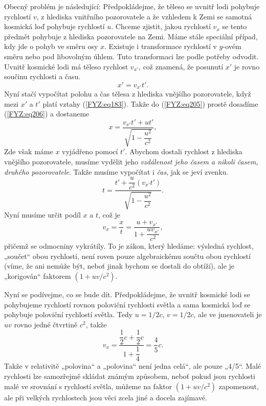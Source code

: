 {    Obecný problém je následující: Předpokládejme, že těleso se uvnitř lodi pohybuje rychlostí 
    \(v\), z hlediska vnitřního pozorovatele a že vzhledem k Zemi se samotná kosmická loď pohybuje 
    rychlostí \(u\). Chceme zjistit, jakou rychlostí \(v_x\) se tento předmět pohybuje z hlediska 
    pozorovatele na Zemi. Máme stále speciální případ, kdy jde o pohyb ve směru osy \(x\). Existuje 
    i transformace rychlostí v \(y\)-ovém směru nebo pod libovolným úhlem. Tuto transformaci lze 
    podle potřeby odvodit. Uvnitř kosmické lodi má těleso rychlost \(v_{x'}\), což znamená, že 
    posunutí \(x'\) je rovno součinu rychlosti a času.
    \begin{equation}\label{FYZ:eq206}
      x' = v_{x'}t'. 
    \end{equation}
    Nyní stačí vypočítat polohu a čas tělesa z hlediska vnějšího pozorovatele, když mezi \(x'\) a 
    \(t'\) platí vztahy (\ref{FYZ:eq183}). Takže do (\ref{FYZ:eq205}) prostě dosadíme 
    (\ref{FYZ:eq206}) a dostaneme
    \begin{equation}\label{FYZ:eq207}
      x = \frac{v_{x'}t' + ut'}{\sqrt{1-\dfrac{u^2}{c^2}}},
    \end{equation}
    Zde však máme \(x\) vyjádřeno pomocí \(t'\). Abychom dostali rychlost z hlediska vnějšího 
    pozorovatele, musíme vydělit jeho \emph{vzdálenost jeho časem a nikoli časem, druhého 
    pozorovatele}. Takže musíme vypočítat i \emph{čas}, jak se jeví zvenku.
    \begin{equation}\label{FYZ:eq208}
      t = \frac{t'+\dfrac{u}{c^2}(v_{x'}t')}{\sqrt{1-\dfrac{u^2}{c^2}}}. 
    \end{equation}
    Nyní musíme určit podíl \(x\) a \(t\), což je
    \begin{equation}\label{FYZ:eq209}
      v_x = \frac{x}{t} = \frac{u+v_{x'}}{1+\dfrac{uv_{x'}}{c^2}},
    \end{equation}
    přičemž se odmocniny vykrátily. To je zákon, který hledáme: výsledná rychlost, „součet“ obou 
    rychlostí, není roven pouze algebraickému součtu obou rychlostí (víme, že ani nemůže být, neboť 
    jinak bychom se dostali do obtíží), ale je „korigován“ faktorem \((1 + uv/c^2)\).
    
    Nyní se podívejme, co se bude dít. Předpokládejme, že uvnitř kosmické lodi se pohybujeme 
    rychlostí rovnou poloviční rychlosti světla a sama kosmická loď se pohybuje poloviční rychlostí 
    světla. Tedy \(u= 1/2c\), \(v= 1/2c\), ale ve jmenovateli je \(uv\) rovno jedné čtvrtině 
    \(c^2\), takže
    \begin{equation*}
      v_x = \frac{\dfrac{1}{2}c + \dfrac{1}{2}c}{1+\dfrac{1}{4}} = \dfrac{4}{5}c.
    \end{equation*}
    Takže v relativitě „polovina“ a „polovina“ není jedna celá“, ale pouze „\num{4/5}“. Malé 
    rychlosti lze samozřejmě skládat známým způsobem, neboť pokud jsou rychlosti malé ve srovnání s 
    rychlostí světla, můžeme na faktor \((1 + uv/c^2)\) zapomenout, ale při velkých rychlostech 
    jsou věci zcela jiné a docela zajímavé.
    
}
